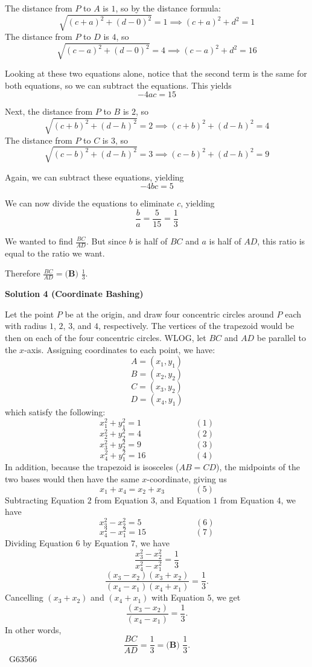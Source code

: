 \begin{enumerate}
 The distance from $P$ to $A$ is $1$, so by the distance formula: 
 \[\sqrt{(c+a)^2+(d-0)^2} = 1 \implies (c+a)^2+d^2 = 1\]The distance from $P$ to $D$ is $4$, so 
 \[\sqrt{(c-a)^2+(d-0)^2} = 4 \implies (c-a)^2+d^2 = 16\]

 Looking at these two equations alone, notice that the second term is the same for both equations, so we can subtract the equations. This yields 
 \[-4ac = 15\]

 Next, the distance from $P$ to $B$ is $2$, so 
 \[\sqrt{(c+b)^2+(d-h)^2} = 2 \implies (c+b)^2+(d-h)^2 = 4\]The distance from $P$ to $C$ is $3$, so 
 \[\sqrt{(c-b)^2+(d-h)^2} = 3 \implies (c-b)^2+(d-h)^2 = 9\]

 Again, we can subtract these equations, yielding 
 \[-4bc = 5\]

 We can now divide the equations to eliminate $c$, yielding 
 \[\frac{b}{a} = \frac{5}{15} = \frac{1}{3}\]

 We wanted to find $\frac{BC}{AD}$. But since $b$ is half of $BC$ and $a$ is half of $AD$, this ratio is equal to the ratio we want.

 Therefore $\frac{BC}{AD} = \boxed{\textbf{(B) }\frac{1}{3}}$.

 



\textbf{Solution 4 (Coordinate Bashing)}

Let the point $P$ be at the origin, and draw four concentric circles around $P$ each with radius $1$, $2$, $3$, and $4$, respectively. The vertices of the trapezoid would be then on each of the four concentric circles. WLOG, let $BC$ and $AD$ be parallel to the $x$-axis. Assigning coordinates to each point, we have: 
 \[A=(x_1,y_1)\] 
 \[B=(x_2,y_2)\] 
 \[C=(x_3,y_2)\] 
 \[D=(x_4,y_1)\] which satisfy the following: 
 \[x_1^2 + y_1^2 = 1 \;\;\;\;\;\;\;\;\;\;\;\;\;\;\;\;\;\;\;\;\;\;\; (1)\]
 \[x_2^2 + y_2^2 = 4 \;\;\;\;\;\;\;\;\;\;\;\;\;\;\;\;\;\;\;\;\;\;\; (2)\]
 \[x_3^2 + y_2^2 = 9 \;\;\;\;\;\;\;\;\;\;\;\;\;\;\;\;\;\;\;\;\;\;\; (3)\]
 \[x_4^2 + y_1^2 = 16 \;\;\;\;\;\;\;\;\;\;\;\;\;\;\;\;\;\;\;\;\; (4)\]In addition, because the trapezoid is isosceles ($AB=CD$), the midpoints of the two bases would then have the same $x$-coordinate, giving us 
 \[x_1 + x_4 = x_2 + x_3 \;\;\;\;\;\;\;\;\;\;\;\;\; (5)\]Subtracting Equation $2$ from Equation $3$, and Equation $1$ from Equation $4$, we have
 \[x_3^2 - x_2^2 = 5 \;\;\;\;\;\;\;\;\;\;\;\;\;\;\;\;\;\;\;\;\;\;\; (6)\]
 \[x_4^2 - x_1^2 = 15 \;\;\;\;\;\;\;\;\;\;\;\;\;\;\;\;\;\;\;\;\; (7)\]Dividing Equation $6$ by Equation $7$, we have
 \[\frac{x_3^2-x_2^2}{x_4^2-x_1^2}=\frac{1}{3}\]
 \[\frac{(x_3-x_2)(x_3+x_2)}{(x_4-x_1)(x_4+x_1)}=\frac{1}{3}.\]Cancelling $(x_3+x_2)$ and $(x_4+x_1)$ with Equation $5$, we get
 \[\frac{(x_3-x_2)}{(x_4-x_1)}=\frac{1}{3}.\]In other words,
 \[\frac{BC}{AD}=\frac{1}{3}=\boxed{\textbf{(B) }\frac{1}{3}}.\]~G63566


\end{enumerate}
